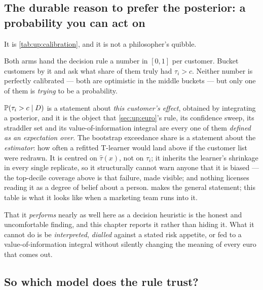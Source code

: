 \subsection*{The durable reason to prefer the posterior: a probability you can act on}

It is \cref{tab:up:calibration}, and it is not a philosopher's quibble.



Both arms hand the decision rule a number in $[0,1]$ per customer. Bucket customers by it and ask
what share of them truly had $\tau_i > c$. Neither number is perfectly calibrated --- both are
optimistic in the middle buckets --- but only one of them is \emph{trying} to be a probability.

$\operatorname{\mathbb{P}}(\tau_i > c \mid D)$ is a statement about \emph{this customer's effect}, obtained by
integrating a posterior, and it is the object that \cref{sec:up:euro}'s rule, its confidence
sweep, its straddler set and its value-of-information integral are every one of them
\emph{defined as an expectation over}. The bootstrap exceedance share is a statement about the
\emph{estimator}: how often a refitted T-learner would land above \eur{\nbOneCost} if the customer
list were redrawn. It is centred on $\hat\tau(x)$, not on $\tau_i$; it inherits the learner's
shrinkage in every single replicate, so it structurally cannot warn anyone that it is biased ---
the top-decile coverage above is that failure, made visible; and nothing licenses reading it as a
degree of belief about a person.  makes the general statement; this table is what
it looks like when a marketing team runs into it.

That it \emph{performs} nearly as well here as a decision heuristic is the honest and
uncomfortable finding, and this chapter reports it rather than hiding it. What it cannot do is be
\emph{interpreted}, \emph{dialled} against a stated risk appetite, or fed to a value-of-information
integral without silently changing the meaning of every euro that comes out.

\subsection*{So which model does the rule trust?}

